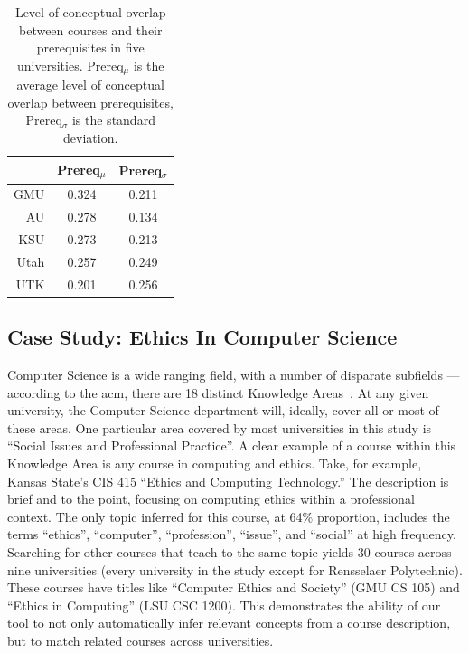 
\begin{table}
  \centering
  \begin{tabular}{rcc}
    \toprule
     & Prereq$_\mu$ & Prereq$_\sigma$ \\
    \midrule
    GMU  & 0.324 & 0.211 \\
    AU   & 0.278 & 0.134 \\
    KSU  & 0.273 & 0.213 \\
    Utah & 0.257 & 0.249 \\
    UTK  & 0.201 & 0.256 \\
    \bottomrule
  \end{tabular}
  \caption{Level of conceptual overlap between courses and their prerequisites in five universities. Prereq$_\mu$ is the average level of conceptual overlap between prerequisites, Prereq$_\sigma$ is the standard deviation.\label{tbl:prereq-topic-overlap}}
\end{table}


\subsection{Case Study: Ethics In Computer Science}
\label{sec:eval-topics-ethics}


Computer Science is a wide ranging field, with a number of disparate subfields --- according to the \ac{acm}, there are 18 distinct Knowledge Areas~\cite{CS2013}.
At any given university, the Computer Science department will, ideally, cover all or most of these areas.
One particular area covered by most universities in this study is ``Social Issues and Professional Practice''.
A clear example of a course within this Knowledge Area is any course in computing and ethics.
Take, for example, Kansas State's CIS 415 ``Ethics and Computing Technology.''
The description is brief and to the point, focusing on computing ethics within a professional context.
The only topic inferred for this course, at 64\% proportion, includes the terms ``ethics'', ``computer'', ``profession'', ``issue'', and ``social'' at high frequency.
Searching for other courses that teach to the same topic yields 30 courses across nine universities (every university in the study except for Rensselaer Polytechnic).
These courses have titles like ``Computer Ethics and Society'' (GMU CS 105) and ``Ethics in Computing'' (LSU CSC 1200).
This demonstrates the ability of our tool to not only automatically infer relevant concepts from a course description, but to match related courses across universities.

